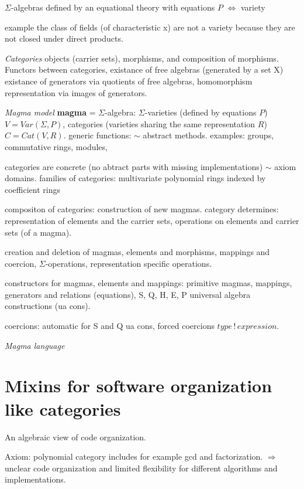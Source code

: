 \documentclass{llncs}
\begin{document}
$\Sigma$-algebras defined by an equational theory with equations $P$ 
$\Longleftrightarrow$ variety

example the class of fields (of characteristic x) are not a variety
because they are not closed under direct products.

{\em Categories} objects (carrier sets), morphisms, and composition of morphisms.
Functors between categories, existance of free algebras (generated by a set X)
existance of generators via quotients of free algebras, 
homomorphism representation via images of generators.

{\em Magma model} {\bf magma} = $\Sigma$-algebra:
$\Sigma$-varieties (defined by equations $P$) $V = Var(\Sigma,P)$, 
categories (varieties sharing the same representation $R$) $C = Cat(V,R)$.
generic functions: $\sim$ abstract methods.
examples: groups, commutative rings, modules,

categories are concrete (no abtract parts with missing implementations) $\sim$ axiom domains.
families of categories: multivariate polynomial rings indexed by coefficient rings

compositon of categories: construction of new magmas.
category determines: representation of elements and the carrier sets, 
operations on elements and carrier sets (of a magma).

creation and deletion of magmas, elements and morphisms, mappings and coercion,
$\Sigma$-operations, representation specific operations.

constructors for magmas, elements and mappings: primitive magmas,
mappings, generators and relations (equations), S, Q, H, E, P
universal algebra constructions (ua cons).

coercions: automatic for S and Q ua cons, forced coercions $type\, !\, expression$.

{\em Magma language}



\section{Mixins for software organization like categories} %
\label{sec:mixin}

An algebraic view of code organization.

Axiom: polynomial category includes for example gcd and factorization.
$\Longrightarrow$ unclear code organization and limited flexibility for
different algorithms and implementations.
\end{document}
